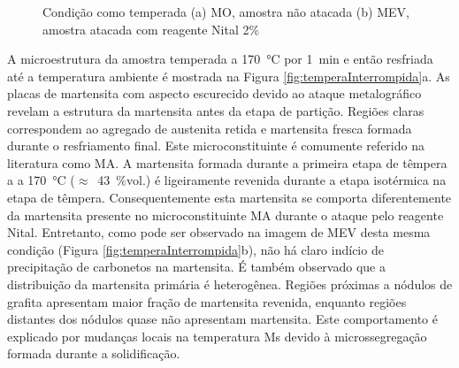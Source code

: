 \begin{figure}
  \centering
  \quad
  \caption{Condição como temperada (a) MO, amostra não atacada (b) MEV, amostra atacada com reagente Nital 2\%}
  \label{fig:tempera}
\end{figure}

A microestrutura da amostra temperada a \SI{170}{\degreeCelsius} por 1~min e então resfriada até a temperatura ambiente é mostrada na Figura \ref{fig:temperaInterrompida}a. As placas de martensita com aspecto escurecido devido ao ataque metalográfico revelam a estrutura da martensita antes da etapa de partição. Regiões claras correspondem ao agregado de austenita retida e martensita fresca formada durante o resfriamento final. Este microconstituinte é comumente referido na literatura como MA. A martensita formada durante a primeira etapa de têmpera a a \SI{170}{\degreeCelsius} ($\approx$~43~\%vol.) é ligeiramente revenida durante a etapa isotérmica na etapa de têmpera. Consequentemente esta martensita se comporta diferentemente da martensita presente no microconstituinte MA durante o ataque pelo reagente Nital. Entretanto, como pode ser observado na imagem de MEV desta mesma condição (Figura \ref{fig:temperaInterrompida}b), não há claro indício de precipitação de carbonetos na martensita. É também observado que a distribuição da martensita primária é heterogênea. Regiões próximas a nódulos de grafita apresentam maior fração de martensita revenida, enquanto regiões distantes dos nódulos quase não apresentam martensita. Este comportamento é explicado por mudanças locais na temperatura Ms devido à microssegregação formada durante a solidificação.

